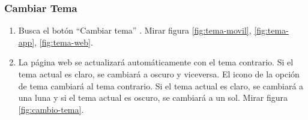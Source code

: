 \subsubsection{Cambiar Tema}
\begin{enumerate}
	\item Busca el botón “Cambiar tema” . Mirar figura \ref{fig:tema-movil}, \ref{fig:tema-app}, \ref{fig:tema-web}.

	\item La página web se actualizará automáticamente con el tema contrario. Si el tema actual es claro, se cambiará a oscuro y viceversa.
	      El icono de la opción de tema cambiará al tema contrario. Si el tema actual es claro, se cambiará a una luna y si el tema actual es oscuro, se cambiará a un sol.
	      Mirar figura \ref{fig:cambio-tema}.

\end{enumerate}

